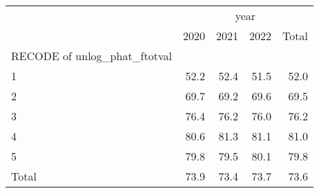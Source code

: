 \begin{tabular}{lllll}
\cline{1-5}
\multicolumn{1}{c}{} &
  \multicolumn{4}{|c}{year} \\
\multicolumn{1}{c}{} &
  \multicolumn{1}{|r}{2020} &
  \multicolumn{1}{r}{2021} &
  \multicolumn{1}{r}{2022} &
  \multicolumn{1}{r}{Total} \\
\cline{1-5}
\multicolumn{1}{l}{RECODE of unlog\_phat\_ftotval} &
  \multicolumn{1}{|r}{} &
  \multicolumn{1}{r}{} &
  \multicolumn{1}{r}{} &
  \multicolumn{1}{r}{} \\
\multicolumn{1}{l}{\hspace{1em}1} &
  \multicolumn{1}{|r}{52.2} &
  \multicolumn{1}{r}{52.4} &
  \multicolumn{1}{r}{51.5} &
  \multicolumn{1}{r}{52.0} \\
\multicolumn{1}{l}{\hspace{1em}2} &
  \multicolumn{1}{|r}{69.7} &
  \multicolumn{1}{r}{69.2} &
  \multicolumn{1}{r}{69.6} &
  \multicolumn{1}{r}{69.5} \\
\multicolumn{1}{l}{\hspace{1em}3} &
  \multicolumn{1}{|r}{76.4} &
  \multicolumn{1}{r}{76.2} &
  \multicolumn{1}{r}{76.0} &
  \multicolumn{1}{r}{76.2} \\
\multicolumn{1}{l}{\hspace{1em}4} &
  \multicolumn{1}{|r}{80.6} &
  \multicolumn{1}{r}{81.3} &
  \multicolumn{1}{r}{81.1} &
  \multicolumn{1}{r}{81.0} \\
\multicolumn{1}{l}{\hspace{1em}5} &
  \multicolumn{1}{|r}{79.8} &
  \multicolumn{1}{r}{79.5} &
  \multicolumn{1}{r}{80.1} &
  \multicolumn{1}{r}{79.8} \\
\multicolumn{1}{l}{\hspace{1em}Total} &
  \multicolumn{1}{|r}{73.9} &
  \multicolumn{1}{r}{73.4} &
  \multicolumn{1}{r}{73.7} &
  \multicolumn{1}{r}{73.6} \\
\cline{1-5}
\end{tabular}
